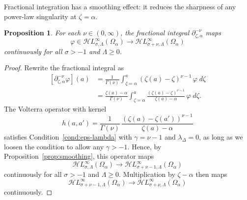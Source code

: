 \documentclass{article}
\theoremstyle{plain}
\newtheorem{prop}{Proposition}
\newcommand{\R}{\mathbb{R}}
\newcommand{\fracderiv}[3]{\partial^{#1}_{#2, #3}}
\newcommand{\singexp}[2]{\mathcal{H}L^\infty_{#1, #2}}
\newcommand{\domain}{\Omega}
\begin{document}
Fractional integration has a smoothing effect: it reduces the sharpness of any power-law singularity at $\zeta = \alpha$.
\begin{prop}\label{prop:frac-int-smoothing}
For each $\nu \in (0, \infty)$, the fractional integral $\fracderiv{-\nu}{\zeta}{\alpha}$ maps
\[ \varphi\in\singexp{\sigma}{\Lambda}(\domain_\alpha) \to \singexp{\sigma+\nu}{\Lambda}(\domain_\alpha) \]
continuously for all $\sigma > -1$ and $\Lambda \ge 0$.
\end{prop}
\begin{proof}
Rewrite the fractional integral as
\begin{align*}
\left[\fracderiv{-\nu}{\zeta}{\alpha} \varphi\right](a)&=\frac{1}{\Gamma(\nu)}\int_{\zeta=\alpha}^a (\zeta(a)-\zeta)^{\nu-1} \, \varphi \; d\zeta\\
&=\frac{\zeta(a)-\alpha}{\Gamma(\nu)}\int_{\zeta=\alpha}^a \frac{(\zeta(a)-\zeta)^{\nu-1}}{\zeta(a)- \alpha}\,\varphi \; d\zeta.
\end{align*}
The Volterra operator with kernel
\[ h(a, a') = \frac{1}{\Gamma(\nu)}\,\frac{(\zeta(a)-\zeta(a'))^{\nu-1}}{\zeta(a)- \alpha} \]
satisfies Condition~\eqref{cond:eps-lambda} with $\gamma=\nu-1$ and $\lambda_\Delta=0$, as long as we loosen the condition to allow any $\gamma > -1$. Hence, by Proposition~\ref{prop:smoothing}, this operator maps
\[ \singexp{\sigma}{\Lambda}(\domain_\alpha) \to \singexp{\sigma+\nu-1}{\Lambda}(\domain_\alpha) \]
continuously for all $\sigma > -1$ and $\Lambda \ge 0$. Multiplication by $\zeta - \alpha$ then maps
\[ \singexp{\sigma+\nu-1}{\Lambda}(\domain_\alpha) \to \singexp{\sigma+\nu}{\Lambda}(\domain_\alpha) \]
continuously.
\end{proof}
\end{document}

